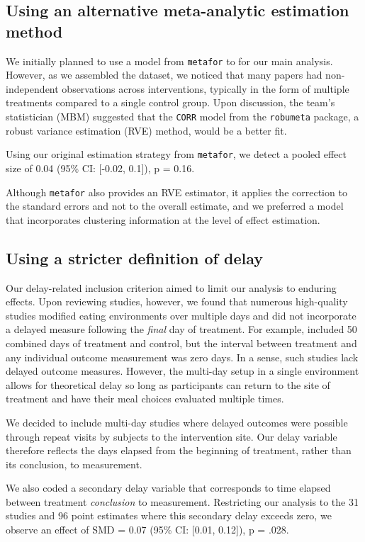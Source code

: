 \documentclass[preprint, 3p,
authoryear]{elsarticle} %
\begin{document}
\subsection{Using an alternative meta-analytic estimation
method}\label{using-an-alternative-meta-analytic-estimation-method}

We initially planned to use a model from \texttt{metafor} to for our
main analysis. However, as we assembled the dataset, we noticed that
many papers had non-independent observations across interventions,
typically in the form of multiple treatments compared to a single
control group. Upon discussion, the team's statistician (MBM) suggested
that the \texttt{CORR} model from the \texttt{robumeta} package, a
robust variance estimation (RVE) method, would be a better fit.

Using our original estimation strategy from \texttt{metafor}, we detect
a pooled effect size of 0.04 (95\% CI: {[}-0.02, 0.1{]}), p = 0.16.

Although \texttt{metafor} also provides an RVE estimator, it applies the
correction to the standard errors and not to the overall estimate, and
we preferred a model that incorporates clustering information at the
level of effect estimation.

\subsection{Using a stricter definition of
delay}\label{using-a-stricter-definition-of-delay}

Our delay-related inclusion criterion aimed to limit our analysis to
enduring effects. Upon reviewing studies, however, we found that
numerous high-quality studies modified eating environments over multiple
days and did not incorporate a delayed measure following the
\emph{final} day of treatment. For example, \citep{andersson2021}
included 50 combined days of treatment and control, but the interval
between treatment and any individual outcome measurement was zero days.
In a sense, such studies lack delayed outcome measures. However, the
multi-day setup in a single environment allows for theoretical delay so
long as participants can return to the site of treatment and have their
meal choices evaluated multiple times.

We decided to include multi-day studies where delayed outcomes were
possible through repeat visits by subjects to the intervention site. Our
delay variable therefore reflects the days elapsed from the beginning of
treatment, rather than its conclusion, to measurement.

We also coded a secondary delay variable that corresponds to time
elapsed between treatment \emph{conclusion} to measurement. Restricting
our analysis to the 31 studies and 96 point estimates where this
secondary delay exceeds zero, we observe an effect of SMD = 0.07 (95\%
CI: {[}0.01, 0.12{]}), p = .028.


\end{document}
